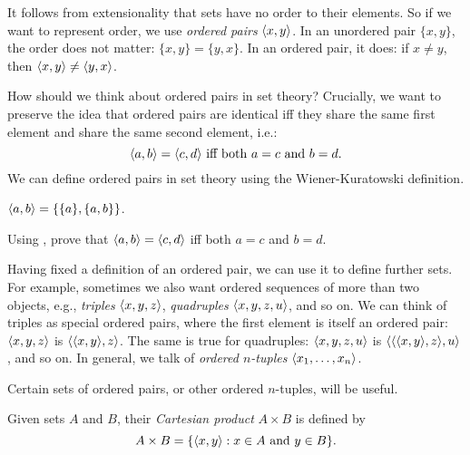 \documentclass[../../../include/open-logic-section]{subfiles}
\begin{document}

\begin{explain}
It follows from extensionality that sets have no order to their
elements. So if we want to represent order, we use \emph{ordered
pairs} $\langle x, y \rangle$. In an unordered pair $\{x, y\}$, the order does
not matter: $\{x, y\} = \{y, x\}$. In an ordered pair, it does: if $x
\neq y$, then $\langle x, y \rangle \neq \langle y, x \rangle$.

How should we think about ordered pairs in set theory? Crucially, we
want to preserve the idea that ordered pairs are identical iff they
share the same first element and share the same second element, i.e.:
\[
  \langle a, b \rangle= \langle c, d \rangle\text{ iff both }a = c \text{ and }b=d.
\]
We can define ordered pairs in set theory using the Wiener-Kuratowski
definition.
\end{explain}

\begin{defn}
	$\langle a, b \rangle = \{\{a\}, \{a, b\}\}$.
\end{defn}

\begin{prob}
	Using , prove that $\langle a,
	b \rangle= \langle c, d \rangle$ iff both $a = c$ and $b=d$.
\end{prob}

\begin{explain}
Having fixed a definition of an ordered pair, we can use it to define
further sets. For example, sometimes we also want ordered sequences of
more than two objects, e.g., \emph{triples} $\langle x, y, z \rangle$,
\emph{quadruples} $\langle x, y, z, u \rangle$, and so on.  We can think of
triples as special ordered pairs, where the first element is itself an
ordered pair: $\langle x, y, z \rangle$ is $\langle \langle x, y \rangle,z \rangle$. The same
is true for quadruples: $\langle x,y,z,u \rangle$ is
$\langle \langle \langle x,y \rangle,z \rangle,u \rangle$, and so on. In general, we talk of
\emph{ordered $n$-tuples} $\langle x_1, \dots, x_n \rangle$.

Certain sets of ordered pairs, or other ordered $n$-tuples, will be useful.
\end{explain}

\begin{defn}
Given sets $A$ and $B$, their \emph{Cartesian product} $A \times B$ is
defined by
\[
  A \times B = \{ \langle x, y \rangle : x \in A \text{ and } y \in B \}.
\]
\end{defn}
\end{document}
